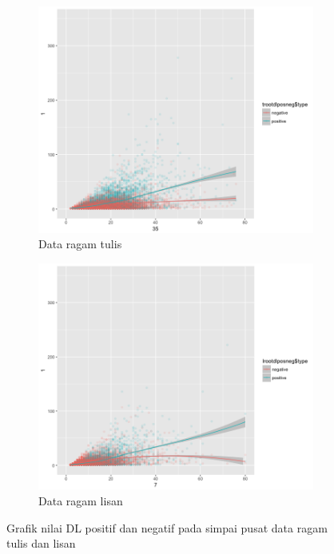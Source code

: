 \begin{figure}
\centering

\begin{subfigure}{.49\linewidth}
  \centering
  \includegraphics[width=1\linewidth] {pics/tulisroot_DLposneg.png} 
	\caption{Data ragam tulis}
	\label{fig:tulisroot_DLposneg} 
\end{subfigure}
%
\begin{subfigure}{.49\linewidth}
  \centering
  \includegraphics[width=1\linewidth]{pics/lisanroot_DLposneg.png} 
	\caption{Data ragam lisan}
	\label{fig:lisanroot_DLposneg} 
\end{subfigure}

\caption{Grafik nilai DL positif dan negatif pada simpai pusat data ragam tulis dan lisan}
\label{fig:rootDL_posneg}
\end{figure}

